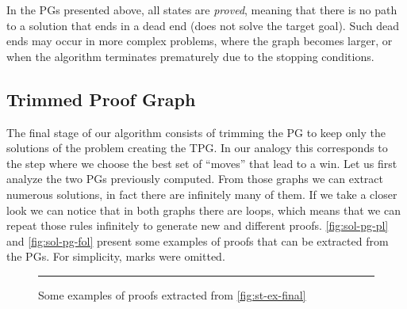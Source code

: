 In the \gls{PG}s presented above, all states are \emph{proved}, meaning that there is no path to a solution that ends in a dead end (does not solve the target goal). Such dead ends may occur in more complex problems, where the graph becomes larger, or when the algorithm terminates prematurely due to the stopping conditions.

\subsection{Trimmed Proof Graph}
The final stage of our algorithm consists of trimming the \gls{PG} to keep only the solutions of the problem creating the \gls{TPG}. In our analogy this corresponds to the step where we choose the best set of ``moves'' that lead to a win. Let us first analyze the two \gls{PG}s previously computed. From those graphs we can extract numerous solutions, in fact there are infinitely many of them. If we take a closer look we can notice that in both graphs there are loops, which means that we can repeat those rules infinitely to generate new and different proofs. \autoref{fig:sol-pg-pl} and \autoref{fig:sol-pg-fol} present some examples of proofs that can be extracted from the \gls{PG}s. For simplicity, marks were omitted.

\begin{figure}[ht]
\centering
\small
\begin{minipage}{0.44\linewidth}
\centering
\begin{prooftree}
  
  
\end{prooftree}
\end{minipage}%
\hfill
\begin{minipage}{0.01\linewidth}
\centering
\rule{0.4pt}{2.5cm} %
\end{minipage}%
\hfill
\begin{minipage}{0.52\linewidth}
\centering
\begin{prooftree}
  
  
  
  
\end{prooftree}
\end{minipage}
\caption{Some examples of proofs extracted from \autoref{fig:st-ex-final} }
\label{fig:sol-pg-pl}
\end{figure}


